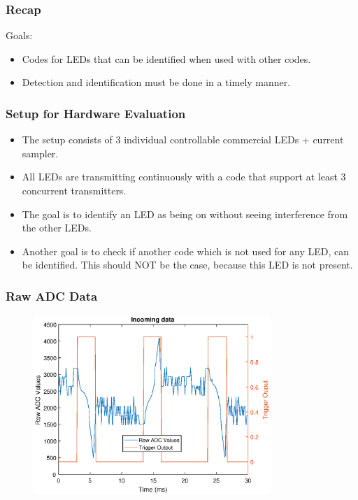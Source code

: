 \documentclass{beamer}
\begin{document}
	\begin{frame}\frametitle{Recap}
		
		Goals: 

		\begin{itemize}

			\item Codes for LEDs that can be identified when used with other codes.

			\item Detection and identification must be done in a timely manner.

		\end{itemize}
	\end{frame}





	\begin{frame}\frametitle{Setup for Hardware Evaluation}
		

		\begin{itemize}

			\item The setup consists of 3 individual controllable commercial LEDs + current sampler.

			\item All LEDs are transmitting continuously with a code that support at least 3 concurrent transmitters.

			\item The goal is to identify an LED as being on without seeing interference from the other LEDs.

			\item Another goal is to check if another code which is not used for any LED, can be identified. This should NOT be the case, because this LED is not present.


		\end{itemize}
	\end{frame}




	\begin{frame}\frametitle{Raw ADC Data}

		\begin{figure}
			\centering
			\includegraphics[width=0.8\textwidth]{ac-raw-data.eps}
		\end{figure}

	\end{frame}
\end{document}
